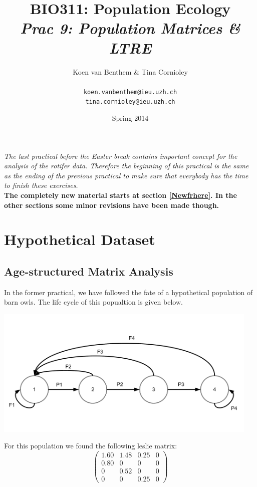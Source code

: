 \documentclass{article}\usepackage[]{graphicx}\usepackage[]{color}
\title{BIO311: Population Ecology\\ \textit{Prac 9: Population Matrices \& LTRE}}
\author{Koen van Benthem \& Tina Cornioley\\\\
\tt{koen.vanbenthem@ieu.uzh.ch}\\ \tt{tina.cornioley@ieu.uzh.ch}}
\date{Spring 2014}
\begin{document}
\maketitle
\tableofcontents
\vspace{3cm}
\newpage
\begin{mdframed}
\textit{The last practical before the Easter break contains important concept for the analysis of the rotifer data. Therefore the beginning of this practical is the same as the ending of the previous practical to make sure that everybody has the time to finish these exercises.}\\[1.5ex]
\textbf{The completely new material starts at section \ref{Newfrhere}. In the other sections some minor revisions have been made though.}
\end{mdframed}
\section{Hypothetical Dataset}
\subsection{Age-structured Matrix Analysis}
In the former practical, we have followed the fate of a hypothetical population of barn owls. The life cycle of this popualtion is given below.
\begin{center}
\includegraphics[width=0.95\textwidth]{Barn_owl_life_cycle.pdf}
\end{center}
For this population we found the following leslie matrix:
\begin{equation}
\begin{pmatrix}
1.60&1.48&0.25&0\\
0.80&0&0&0\\
0&0.52&0&0\\
0&0&0.25&0
\end{pmatrix}
\end{equation}
\end{document}
